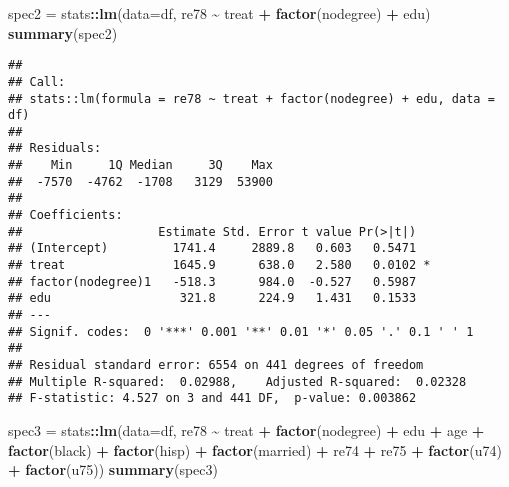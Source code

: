 \documentclass[
]{article}
\newenvironment{Shaded}{\begin{snugshade}}{\end{snugshade}}
\newcommand{\AttributeTok}[1]{\textcolor[rgb]{0.13,0.29,0.53}{#1}}
\newcommand{\FunctionTok}[1]{\textcolor[rgb]{0.13,0.29,0.53}{\textbf{#1}}}
\newcommand{\NormalTok}[1]{#1}
\newcommand{\OtherTok}[1]{\textcolor[rgb]{0.56,0.35,0.01}{#1}}
\newcommand{\SpecialCharTok}[1]{\textcolor[rgb]{0.81,0.36,0.00}{\textbf{#1}}}
\begin{document}
\begin{Shaded}
\begin{Highlighting}[]
\NormalTok{spec2 }\OtherTok{=}\NormalTok{ stats}\SpecialCharTok{::}\FunctionTok{lm}\NormalTok{(}\AttributeTok{data=}\NormalTok{df, re78 }\SpecialCharTok{\textasciitilde{}}\NormalTok{ treat }\SpecialCharTok{+} \FunctionTok{factor}\NormalTok{(nodegree) }\SpecialCharTok{+}\NormalTok{ edu)}
\FunctionTok{summary}\NormalTok{(spec2)}
\end{Highlighting}
\end{Shaded}

\begin{verbatim}
## 
## Call:
## stats::lm(formula = re78 ~ treat + factor(nodegree) + edu, data = df)
## 
## Residuals:
##    Min     1Q Median     3Q    Max 
##  -7570  -4762  -1708   3129  53900 
## 
## Coefficients:
##                   Estimate Std. Error t value Pr(>|t|)  
## (Intercept)         1741.4     2889.8   0.603   0.5471  
## treat               1645.9      638.0   2.580   0.0102 *
## factor(nodegree)1   -518.3      984.0  -0.527   0.5987  
## edu                  321.8      224.9   1.431   0.1533  
## ---
## Signif. codes:  0 '***' 0.001 '**' 0.01 '*' 0.05 '.' 0.1 ' ' 1
## 
## Residual standard error: 6554 on 441 degrees of freedom
## Multiple R-squared:  0.02988,    Adjusted R-squared:  0.02328 
## F-statistic: 4.527 on 3 and 441 DF,  p-value: 0.003862
\end{verbatim}

\begin{Shaded}
\begin{Highlighting}[]
\NormalTok{spec3 }\OtherTok{=}\NormalTok{ stats}\SpecialCharTok{::}\FunctionTok{lm}\NormalTok{(}\AttributeTok{data=}\NormalTok{df, re78 }\SpecialCharTok{\textasciitilde{}}\NormalTok{ treat }\SpecialCharTok{+} \FunctionTok{factor}\NormalTok{(nodegree) }\SpecialCharTok{+}\NormalTok{ edu }\SpecialCharTok{+}\NormalTok{ age }\SpecialCharTok{+} \FunctionTok{factor}\NormalTok{(black) }\SpecialCharTok{+} \FunctionTok{factor}\NormalTok{(hisp) }\SpecialCharTok{+} \FunctionTok{factor}\NormalTok{(married) }\SpecialCharTok{+}\NormalTok{ re74 }\SpecialCharTok{+}\NormalTok{ re75 }\SpecialCharTok{+} \FunctionTok{factor}\NormalTok{(u74) }\SpecialCharTok{+} \FunctionTok{factor}\NormalTok{(u75))}
\FunctionTok{summary}\NormalTok{(spec3)}
\end{Highlighting}
\end{Shaded}
\end{document}
